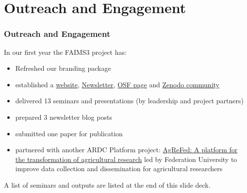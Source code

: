 \documentclass[
	aspectratio=169, %
	11pt, %
	t, %
]{beamer}
\begin{document}

\section{Outreach and Engagement}

\begin{frame}%
	\frametitle{Outreach and Engagement}
    In our first year the FAIMS3 project has:
    \begin{itemize}
        \item Refreshed our branding package
        \item established a \href{https://faims.edu.au/}{website}, \href{https://faims.substack.com}{Newsletter}, \href{https://osf.io/mqk45/}{OSF page} and \href{https://zenodo.org/communities/faims/}{Zenodo community} 
        \item delivered 13 seminars and presentations (by leadership and project partners)
        \item prepared 3 newsletter blog posts
        \item submitted one paper for publication
        \item partnered with another ARDC Platform project: \href{https://doi.org/10.47486/PL005}{AgReFed: A platform for the transformation of agricultural research} led by Federation University to improve data collection and dissemination for agricultural researchers
        \end{itemize}
    
    \medskip
    
   A list of seminars and outputs are listed at the end of this slide deck. 

\end{frame}

    
\end{document}
